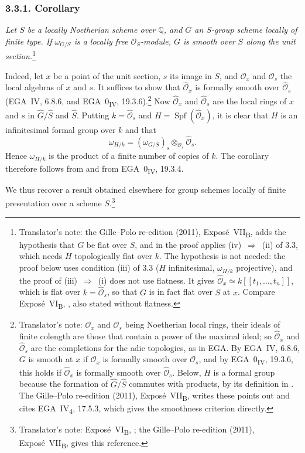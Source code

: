 
\subsubsection*{3.3.1. Corollary}
\label{sga3:VIIB:3.3.1}

{\itshape Let \(S\) be a locally Noetherian scheme over \(\mathbb Q\),
and \(G\) an \(S\)-group scheme locally of finite type. If
\(\omega_{G/S}\) is a locally free \(\mathcal O_S\)-module, \(G\) is smooth
over \(S\) along the unit section.}\footnote{Translator's note: the Gille--Polo re-edition (2011),
Expos\'e~VII\textsubscript{B}, adds the hypothesis that \(G\) be flat over \(S\), and in the proof applies
(iv)~\(\Rightarrow\)~(ii) of 3.3, which needs \(H\) topologically flat over \(k\). The hypothesis is not
needed: the proof below uses condition (iii) of 3.3 (\(H\) infinitesimal, \(\omega_{H/k}\) projective), and
the proof of (iii)~\(\Rightarrow\)~(i) does not use flatness. It gives
\(\widehat{\mathcal O}_x\simeq k[[t_1,\ldots,t_n]]\), which is flat over \(k=\widehat{\mathcal O}_s\), so that
\(G\) is in fact flat over \(S\) at \(x\). Compare Expos\'e~VI\textsubscript{B}, ,
also stated without flatness.}

Indeed, let \(x\) be a point of the unit section, \(s\) its image in
\(S\), and \(\mathcal O_x\) and \(\mathcal O_s\) the local algebras of \(x\)
and \(s\). It suffices to show that \(\widehat{\mathcal O}_x\) is formally
smooth over \(\widehat{\mathcal O}_s\) \textup{(EGA~IV, 6.8.6, and
EGA~0\textsubscript{IV}, 19.3.6)}.\footnote{Translator's note: \(\mathcal O_x\) and \(\mathcal O_s\) being
Noetherian local rings, their ideals of finite colength are those that contain a power of the maximal
ideal; so \(\widehat{\mathcal O}_x\) and \(\widehat{\mathcal O}_s\) are the completions for the adic topologies, as
in EGA. By EGA~IV, 6.8.6, \(G\) is smooth at \(x\) if \(\mathcal O_x\) is formally smooth over
\(\mathcal O_s\), and by EGA~0\textsubscript{IV}, 19.3.6, this holds if \(\widehat{\mathcal O}_x\) is formally smooth
over \(\widehat{\mathcal O}_s\). Below, \(H\) is a formal group because the formation of
\(\widehat G/\widehat S\) commutes with products, by its definition in . The Gille--Polo
re-edition (2011), Expos\'e~VII\textsubscript{B}, writes these points out and cites EGA~IV\textsubscript{4},
17.5.3, which gives the smoothness criterion directly.} Now \(\widehat{\mathcal O}_x\) and
\(\widehat{\mathcal O}_s\) are the local rings of \(x\) and \(s\) in
\(\widehat G/\widehat S\) and \(\widehat S\). Putting
\(k=\widehat{\mathcal O}_s\) and \(H=\operatorname{Spf}(\widehat{\mathcal O}_x)\), it
is clear that \(H\) is an infinitesimal formal group over \(k\) and that
\[
  \omega_{H/k}
  =
  (\omega_{G/S})_s\otimes_{\mathcal O_s}\widehat{\mathcal O}_s.
\]
Hence \(\omega_{H/k}\) is the product of a finite number of copies of
\(k\). The corollary therefore follows from  and from
EGA~0\textsubscript{IV}, 19.3.4.

We thus recover a result obtained elsewhere for group schemes locally
of finite presentation over a scheme \(S\).\footnote{Translator's note: Expos\'e~VI\textsubscript{B},
; the Gille--Polo re-edition (2011), Expos\'e~VII\textsubscript{B}, gives this reference.}
